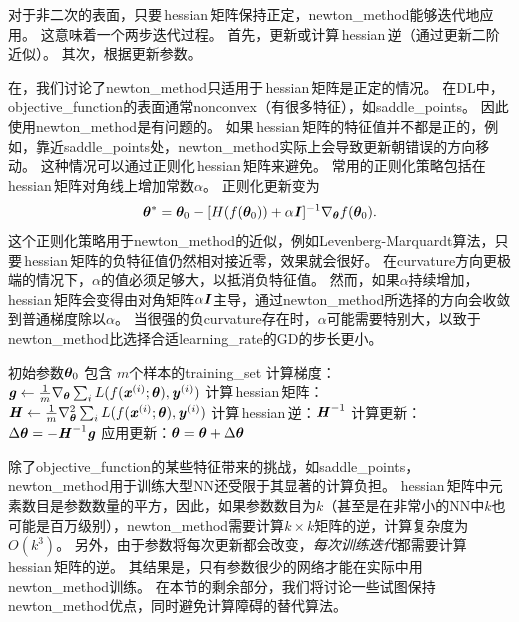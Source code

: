 对于非二次的表面，只要\,\gls{hessian}\,矩阵保持正定，\gls{newton_method}能够迭代地应用。
这意味着一个两步迭代过程。
首先，更新或计算\,\gls{hessian}\,逆（通过更新二阶近似）。
其次，根据更新参数。


在，我们讨论了\gls{newton_method}只适用于\,\gls{hessian}\,矩阵是正定的情况。
在\gls{DL}中，\gls{objective_function}的表面通常\gls{nonconvex}（有很多特征），如\gls{saddle_points}。
因此使用\gls{newton_method}是有问题的。
如果\,\gls{hessian}\,矩阵的特征值并不都是正的，例如，靠近\gls{saddle_points}处，\gls{newton_method}实际上会导致更新朝错误的方向移动。
这种情况可以通过正则化\,\gls{hessian}\,矩阵来避免。
常用的正则化策略包括在\,\gls{hessian}\,矩阵对角线上增加常数$\alpha$。
正则化更新变为
\begin{equation}
    \boldsymbol{\theta}^* = \boldsymbol{\theta}_0 - [ H( f(\boldsymbol{\theta}_0)) + \alpha \boldsymbol{\mathit{I}}  ]^{-1} \nabla_{\boldsymbol{\theta}} f(\boldsymbol{\theta}_0).
\end{equation}
这个正则化策略用于\gls{newton_method}的近似，例如Levenberg-Marquardt算法\citep{Levenberg44,Marquardt63}，只要\,\gls{hessian}\,矩阵的负特征值仍然相对接近零，效果就会很好。
在\gls{curvature}方向更极端的情况下，$\alpha$的值必须足够大，以抵消负特征值。
然而，如果$\alpha$持续增加，\gls{hessian}\,矩阵会变得由对角矩阵$\alpha \boldsymbol{\mathit{I}}$主导，通过\gls{newton_method}所选择的方向会收敛到普通梯度除以$\alpha$。
当很强的负\gls{curvature}存在时，$\alpha$可能需要特别大，以致于\gls{newton_method}比选择合适\gls{learning_rate}的\gls{GD}的步长更小。

\begin{algorithm}[ht]
\caption{目标为$J(\Vtheta)= \frac{1}{m} \sum_{i=1}^m L(f(\Vx^{(i)};\Vtheta), y^{(i)})$的\gls{newton_method}}
\label{alg:newton}
\begin{algorithmic}
\REQUIRE 初始参数$\boldsymbol{\theta}_{0}$
\REQUIRE 包含 $m$个样本的\gls{training_set}
      \STATE 计算梯度： $\boldsymbol{\mathit{g}} \leftarrow 
     \frac{1}{m} \nabla_{\boldsymbol{\theta}} \sum_i L(f(\boldsymbol{\mathit{x}}^{(i)};\boldsymbol{\theta}),\boldsymbol{\mathit{y}}^{(i)})$ 
      \STATE 计算\,\gls{hessian}\,矩阵：$\boldsymbol{\mathit{H}} \leftarrow  
     \frac{1}{m} \nabla_{\boldsymbol{\theta}}^2 \sum_i L(f(\boldsymbol{\mathit{x}}^{(i)};\boldsymbol{\theta}),\boldsymbol{\mathit{y}}^{(i)})$ 
    \STATE 计算\,\gls{hessian}\,逆：$\boldsymbol{\mathit{H}}^{-1}$
    \STATE 计算更新： $\Delta \boldsymbol{\theta} = - \boldsymbol{\mathit{H}}^{-1} \boldsymbol{\mathit{g}}$
    \STATE 应用更新：$\boldsymbol{\theta} = \boldsymbol{\theta}+\Delta \boldsymbol{\theta}$
\ENDWHILE
\end{algorithmic}
\end{algorithm}


除了\gls{objective_function}的某些特征带来的挑战，如\gls{saddle_points}，\gls{newton_method}用于训练大型\gls{NN}还受限于其显著的计算负担。
\gls{hessian}\,矩阵中元素数目是参数数量的平方，因此，如果参数数目为$k$（甚至是在非常小的\gls{NN}中$k$也可能是百万级别），\gls{newton_method}需要计算$k\times k$矩阵的逆，计算复杂度为$O(k^3)$。
另外，由于参数将每次更新都会改变，\emph{每次训练迭代}都需要计算\,\gls{hessian}\,矩阵的逆。
其结果是，只有参数很少的网络才能在实际中用\gls{newton_method}训练。
在本节的剩余部分，我们将讨论一些试图保持\gls{newton_method}优点，同时避免计算障碍的替代算法。

